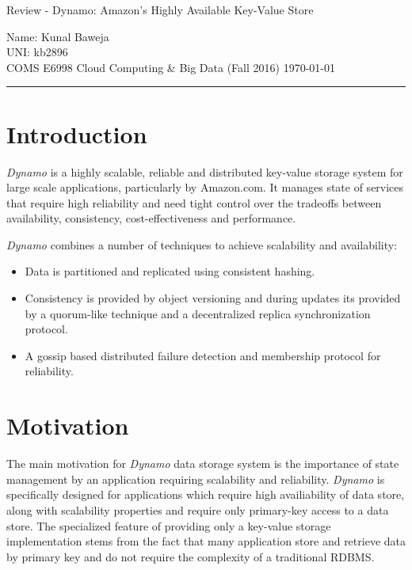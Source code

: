 \documentclass[12pt, a4paper]{article}
\def\name{Kunal Baweja}
\def\uni{kb2896}
\def\assignment{Review - Dynamo: Amazon's Highly Available Key-Value Store}
\def\subject{COMS E6998 Cloud Computing \& Big Data (Fall 2016)}
\begin{document}
\begin{center}
    {\large \assignment}
    \vspace{0.1em}
\end{center}

Name: {\name}\\
UNI: {\uni}\\
{\subject} \hfill {\today}

\rule{\textwidth}{0.2pt}

\section*{Introduction}
\textit{Dynamo}\cite{DeCandia:2007:DAH:1294261.1294281} is a highly scalable, reliable and distributed key-value storage system for large scale applications, particularly by Amazon.com. It manages state of services that require high reliability and need tight control over the tradeoffs between availability, consistency, cost-effectiveness and performance.\par

\textit{Dynamo}\cite{DeCandia:2007:DAH:1294261.1294281} combines a number of techniques to achieve scalability and availability:
\begin{itemize}
        \setlength\itemsep{0em}
        \item Data is partitioned and replicated using consistent hashing.
        \item Consistency is provided by object versioning and during updates its provided by a quorum-like technique and a decentralized replica synchronization protocol.
        \item A gossip based distributed failure detection and membership protocol for reliability.
\end{itemize}

\section*{Motivation}
The main motivation for \textit{Dynamo}\cite{DeCandia:2007:DAH:1294261.1294281} data storage system is the importance of state management by an application requiring scalability and reliability. \textit{Dynamo}\cite{DeCandia:2007:DAH:1294261.1294281} is specifically designed for applications which require high availiability of data store, along with scalability properties and require only primary-key access to a data store. The specialized feature of providing only a key-value storage implementation stems from the fact that many application store and retrieve data by primary key and do not require the complexity of a traditional RDBMS.\par
\end{document}
